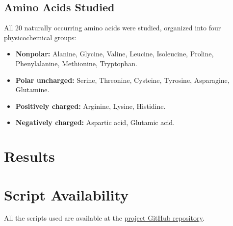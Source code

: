 \documentclass[12pt]{article}
\begin{document}
\subsection{Amino Acids Studied}

All 20 naturally occurring amino acids were studied, organized into four physicochemical groups:
\begin{itemize}
    \item \textbf{Nonpolar:} Alanine, Glycine, Valine, Leucine, Isoleucine, Proline, Phenylalanine, Methionine, Tryptophan.
    \item \textbf{Polar uncharged:} Serine, Threonine, Cysteine, Tyrosine, Asparagine, Glutamine.
    \item \textbf{Positively charged:} Arginine, Lysine, Histidine.
    \item \textbf{Negatively charged:} Aspartic acid, Glutamic acid.
\end{itemize}

\section{Results}


\section{Script Availability}

All the scripts used are available at the \href{https://github.com/UberMayinch/Homomeric-Polypeptide-Steered-Molecular-Dynamics}{project GitHub repository}.



\end{document}
